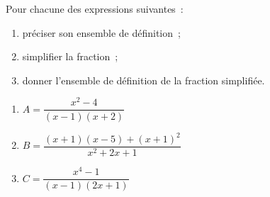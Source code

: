 
Pour chacune des expressions suivantes~:
\begin{enumerate}[label=\alph*.]
     \item %
     préciser son ensemble de définition~;
     \item %
     simplifier la fraction~;
     \item %
     donner l'ensemble de définition de la fraction simplifiée.
\end{enumerate}
\par
\begin{enumerate}
     \item %
     $A=\dfrac{x^2-4}{(x-1)(x+2)}$
     \item %
     $B=\dfrac{(x+1)(x-5)+(x+1)^2}{x^2+2x+1}$
     \item %
     $C=\dfrac{x^4-1}{(x-1)(2x+1)}$
\end{enumerate}
